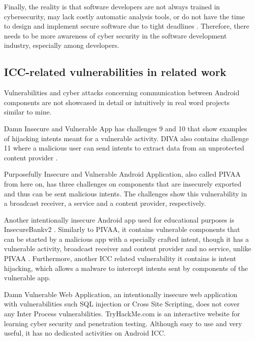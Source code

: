 		Finally, the reality is that software developers are not always trained in cybersecurity, may lack costly automatic analysis tools, or do not have the time to design and implement secure software due to tight deadlines \cite{malwarebytes_blog}. Therefore, there needs to be more awareness of cyber security in the software development industry, especially among developers.
		
		\subsection{ICC-related vulnerabilities in related work}
		    \label{subsec:ICC_related_work}
		
		Vulnerabilities and cyber attacks concerning communication between Android components are not showcased in detail or intuitively in real word projects similar to mine.
		
		Damn Insecure and Vulnerable App has challenges 9 and 10 that show examples of hijacking intents meant for a vulnerable activity. DIVA also contains challenge 11 where a malicious user can send intents to extract data from an unprotected content provider \cite{diva_walkthrough}. 
		
		Purposefully Insecure and Vulnerable Android Application, also called PIVAA from here on, has three challenges on components that are insecurely exported and thus can be sent malicious intents. The challenges show this vulnerability in a broadcast receiver, a service and a content provider, respectively.
		
		Another intentionally insecure Android app used for educational purposes is InsecureBankv2 \cite{android_insecure_bank_github}. Similarly to PIVAA, it contains vulnerable components that can be started by a malicious app with a specially crafted intent, though it has a vulnerable activity, broadcast receiver and content provider and no service, unlike PIVAA \cite{android_insecure_bank_walkthrough}. Furthermore, another ICC related vulnerability it contains is intent hijacking, which allows a malware to intercept intents sent by components of the vulnerable app.
		
		Damn Vulnerable Web Application, an intentionally insecure web application with vulnerabilities such SQL injection or Cross Site Scripting, does not cover any Inter Process vulnerabilities. TryHackMe.com is an interactive website for learning cyber security and penetration testing. Although easy to use and very useful, it has no dedicated activities on Android ICC.
		

